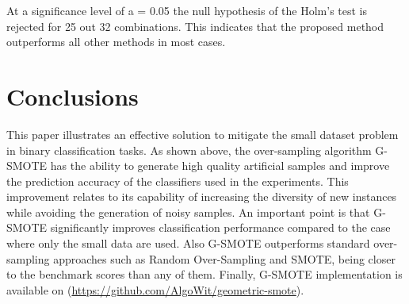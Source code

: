 \documentclass[parskip=full]{scrartcl}
\begin{document}
At a significance level of a = 0.05 the null hypothesis of the Holm's test is
rejected for 25 out 32 combinations. This indicates that the proposed method
outperforms all other methods in most cases.  

\section{Conclusions}

This paper illustrates an effective solution to mitigate the small dataset
problem in binary classification tasks. As shown above, the over-sampling
algorithm G-SMOTE has the ability to generate high quality artificial samples
and improve the prediction accuracy of the classifiers used in the experiments.
This improvement relates to its capability of increasing the diversity of new
instances while avoiding the generation of noisy samples. An important point is
that G-SMOTE significantly improves classification performance compared to the
case where only the small data are used. Also G-SMOTE outperforms standard
over-sampling approaches such as Random Over-Sampling and SMOTE, being closer to
the benchmark scores than any of them. Finally, G-SMOTE implementation is
available on (\url{https://github.com/AlgoWit/geometric-smote}).



\end{document}
